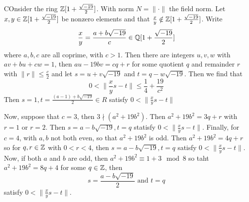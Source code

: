 \begin{example}\label{2.5}
    COnsider the ring $\mathbb{Z}[1+\frac{\sqrt{-19}}{2}]$. With norm  $N=\|\cdot\|$ the
    field norm. Let $x,y \in \mathbb{Z}[1+\frac{\sqrt{-19}}{2}]$ be nonzero elements and
    that $\frac{x}{y} \notin \mathbb{Z}[1+\frac{\sqrt{-19}}{2}]$. Write
    \begin{equation*}
        \frac{x}{y}=\frac{a+b\sqrt{-19}}{c} \in \mathbb{Q}[1+\frac{\sqrt{-19}}{2}]
    \end{equation*}
    where $a,b,c$ are all coprime, with  $c>1$. Then there are integers $u,v,w$
    with $av+bu+cw=1$, then  $au-19bv=cq+r$ for some quotient $q$ and remainder
    $r$ with  $\|r\| \leq \frac{c}{2}$ and let $s=u+v\sqrt{-19}$ and
    $t=q-w\sqrt{-19}$. Then we find that
    \begin{equation*}
        0<\|\frac{x}{y}s-t\| \leq \frac{1}{4}+\frac{19}{c^2}
    \end{equation*}
    Then $s=1, t=\frac{(a-1)+b\sqrt{-19}}{2} \in R$ satisfy $0<\|\frac{x}{y}s-t\|$

    Now, suppose that $c=3$, then $3 \nmid (a^2+19b^2)$. Then $a^2+19b^2=3q+r$
    with  $r=1$ or $r=2$. Then $s=a-b\sqrt{-19},t=q$ statisfy
    $0<\|\frac{x}{y}s-t\|$. Finally, for $c=4$, with $a,b$ not both even, so
    that $a^2+19b^2$ is odd. Then $a^2+19b^2=4q+r$ so for $q,r \in \mathbb{Z}$ with
    $0<r<4$, then $s=a-b\sqrt{-19}, t=q$ satisfy $0<\|\frac{x}{y}s-t\|$. Now, if
    both $a$ and  $b$ are odd, then  $a^2+19b^2 \equiv 1+3 \mod{8}$ so taht
    $a^2+19b^2=8q+4$ for some  $q \in \mathbb{Z}$, then
    \begin{equation*}
        s=\frac{a-b\sqrt{-19}}{2} \text{ and } t=q
    \end{equation*}
    satisfy $0<\|\frac{x}{y}s-t\|$.
\end{example}
